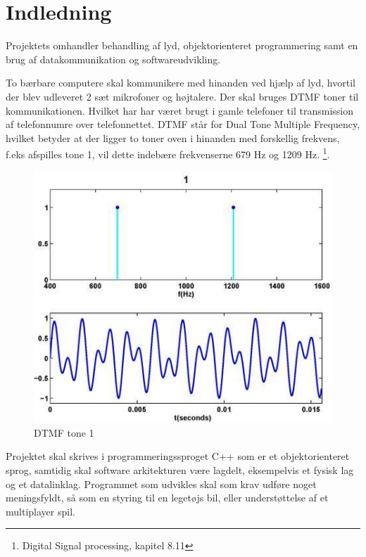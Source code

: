 \section{Indledning}
Projektets omhandler behandling af lyd, objektorienteret programmering samt en brug af datakommunikation og softwareudvikling.

To bærbare computere skal kommunikere med hinanden ved hjælp af lyd, hvortil der blev udleveret 2 sæt mikrofoner og højtalere.
Der skal bruges DTMF toner til kommunikationen. Hvilket har har været brugt i gamle telefoner til transmission af telefonnumre over telefonnettet. DTMF står for Dual Tone Multiple Frequency, hvilket betyder at der ligger to toner oven i hinanden med forskellig frekvens, f.eks afspilles tone 1, vil dette indebære frekvenserne 679 Hz og 1209 Hz. \footnote{Digital Signal processing, kapitel 8.11}.

\begin{figure}[h]
\centering
\includegraphics[scale=0.5]{Billeder/DTMF1.JPG}
\caption{DTMF tone 1}
\label{fig:DTMF1}
\end{figure}

Projektet skal skrives i programmeringssproget C++ som er et objektorienteret sprog, samtidig skal software arkitekturen være lagdelt, eksempelvis et fysisk lag og et datalinklag.
Programmet som udvikles skal som krav udføre noget meningsfyldt, så som en styring til en legetøjs bil, eller understøttelse af et multiplayer spil.  